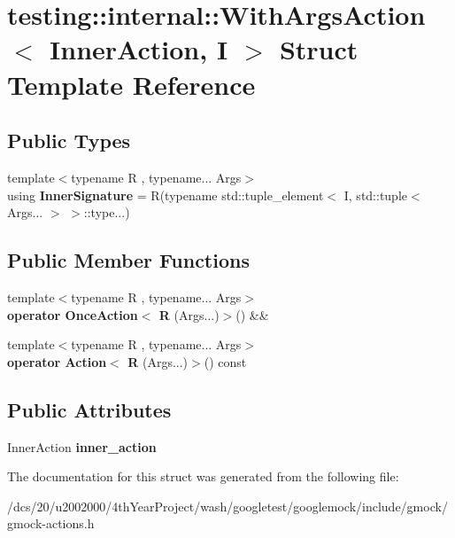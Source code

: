\hypertarget{structtesting_1_1internal_1_1WithArgsAction}{}\section{testing\+:\+:internal\+:\+:With\+Args\+Action$<$ Inner\+Action, I $>$ Struct Template Reference}
\label{structtesting_1_1internal_1_1WithArgsAction}
\subsection*{Public Types}
\begin{DoxyCompactItemize}
\item 
\mbox{\label{structtesting_1_1internal_1_1WithArgsAction_a165879bed54014ada3e9bbb45dd377e5}} 
{\footnotesize template$<$typename R , typename... Args$>$ }\\using {\bfseries Inner\+Signature} = R(typename std\+::tuple\+\_\+element$<$ I, std\+::tuple$<$ Args... $>$ $>$\+::type...)
\end{DoxyCompactItemize}
\subsection*{Public Member Functions}
\begin{DoxyCompactItemize}
\item 
\mbox{\label{structtesting_1_1internal_1_1WithArgsAction_a3fbaa2c31bc1f0e75ebaa54d5af9b4ed}} 
{\footnotesize template$<$typename R , typename... Args$>$ }\\{\bfseries operator Once\+Action$<$ R} (Args...)$>$() \&\&
\item 
\mbox{\label{structtesting_1_1internal_1_1WithArgsAction_a2c4bbb449ac39c58035fa85c2716ee64}} 
{\footnotesize template$<$typename R , typename... Args$>$ }\\{\bfseries operator Action$<$ R} (Args...)$>$() const
\end{DoxyCompactItemize}
\subsection*{Public Attributes}
\begin{DoxyCompactItemize}
\item 
\mbox{\label{structtesting_1_1internal_1_1WithArgsAction_abe6da3bc9f57fa5926b5f53b8095a90d}} 
Inner\+Action {\bfseries inner\+\_\+action}
\end{DoxyCompactItemize}


The documentation for this struct was generated from the following file\+:\begin{DoxyCompactItemize}
\item 
/dcs/20/u2002000/4th\+Year\+Project/wash/googletest/googlemock/include/gmock/gmock-\/actions.\+h\end{DoxyCompactItemize}
